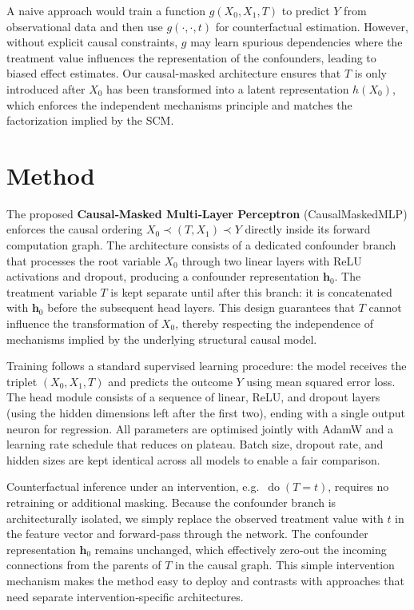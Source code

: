 \documentclass[11pt,a4paper]{article}
\begin{document}
A naive approach would train a function $g(X_0, X_1, T)$ to predict $Y$ from observational data and then use $g(\cdot, \cdot, t)$ for counterfactual estimation. However, without explicit causal constraints, $g$ may learn spurious dependencies where the treatment value influences the representation of the confounders, leading to biased effect estimates. Our causal-masked architecture ensures that $T$ is only introduced after $X_0$ has been transformed into a latent representation $h(X_0)$, which enforces the independent mechanisms principle and matches the factorization implied by the SCM.

\section{Method}
\label{sec:method}
The proposed \textbf{Causal‑Masked Multi‑Layer Perceptron} (CausalMaskedMLP) enforces the causal ordering $X_0 \prec (T, X_1) \prec Y$ directly inside its forward computation graph.
The architecture consists of a dedicated confounder branch that processes the root variable $X_0$ through two linear layers with ReLU activations and dropout, producing a confounder representation $\mathbf{h}_0$.
The treatment variable $T$ is kept separate until after this branch: it is concatenated with $\mathbf{h}_0$ before the subsequent head layers.
This design guarantees that $T$ cannot influence the transformation of $X_0$, thereby respecting the independence of mechanisms implied by the underlying structural causal model.

Training follows a standard supervised learning procedure: the model receives the triplet $(X_0, X_1, T)$ and predicts the outcome $Y$ using mean squared error loss.
The head module consists of a sequence of linear, ReLU, and dropout layers (using the hidden dimensions left after the first two), ending with a single output neuron for regression.
All parameters are optimised jointly with AdamW and a learning rate schedule that reduces on plateau.
Batch size, dropout rate, and hidden sizes are kept identical across all models to enable a fair comparison.

Counterfactual inference under an intervention, e.g.\ $\operatorname{do}(T=t)$, requires no retraining or additional masking.
Because the confounder branch is architecturally isolated, we simply replace the observed treatment value with $t$ in the feature vector and forward‑pass through the network.
The confounder representation $\mathbf{h}_0$ remains unchanged, which effectively zero‑out the incoming connections from the parents of $T$ in the causal graph.
This simple intervention mechanism makes the method easy to deploy and contrasts with approaches that need separate intervention‑specific architectures.
\end{document}
